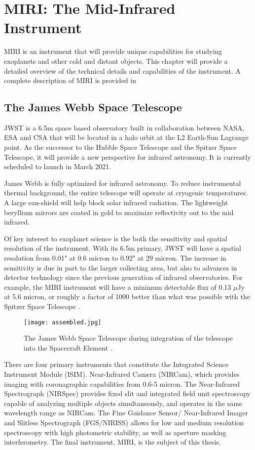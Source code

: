 \chapter{MIRI: The Mid-Infrared Instrument}
MIRI is an instrument that will provide unique capabilities for studying exoplanets and other cold and distant objects. This chapter will provide a detailed overview of the technical details and capabilities of the instrument. A complete description of MIRI is provided in \parencite{MIRI1,MIRI2,10.1086/6822554, MIRI4,MIRI5,MIRI6,MIRI7,MIRI8,MIRI9}
%
%
\section{The James Webb Space Telescope}
JWST is a 6.5m space based observatory built in collaboration between NASA, ESA and CSA that will be located in a halo orbit at the L2 Earth-Sun Lagrange point. 
As the successor to the Hubble Space Telescope and the Spitzer Space Telescope, it will provide a new perspective for infrared astronomy. 
It is currently scheduled to launch in March 2021.

James Webb is fully optimized for infrared astronomy. 
To reduce instrumental thermal background, the entire telescope will operate at cryogenic temperatures. 
A large sun-shield will help block solar infrared radiation.
The lightweight beryllium mirrors are coated in gold to maximize reflectivity out to the mid infrared.

Of key interest to exoplanet science is the both the sensitivity and spatial resolution of the instrument. 
With its 6.5m primary, JWST will have a spatial resolution from 0.01" at 0.6 micron to 0.92" at 29 micron.
The increase in sensitivity is due in part to the larger collecting area, but also to advances in detector technology since the previous generation of infrared observatories.
For example, the MIRI instrument will have a minimum detectable flux of 0.13 $\mu$Jy at 5.6 micron, or roughly a factor of 1000 better than what was possible with the Spitzer Space Telescope \parencite{MIRI9}.
\begin{figure}[t]
	\texttt{[image: assembled.jpg]}
	\caption{The James Webb Space Telescope during integration of the telescope into the Spacecraft Element \parencite{assembled}. }
	\label{fig:jwst}
\end{figure}

There are four primary instruments that constitute the Integrated Science Instrument Module (ISIM). 
Near-Infrared Camera (NIRCam), which provides imaging with coronagraphic capabilities from 0.6-5 micron.
The Near-Infrared Spectrograph (NIRSpec) provides fixed slit and integrated field unit spectroscopy capable of analyzing multiple objects simultaneously, and operates in the same wavelength range as NIRCam.
The Fine Guidance Sensor/ Near-Infrared Imager and Slitless Spectrograph (FGS/NIRISS) allows for low and medium resolution spectroscopy with high photometric stability, as well as aperture masking interferometry. 
The final instrument, MIRI, is the subject of this thesis.

